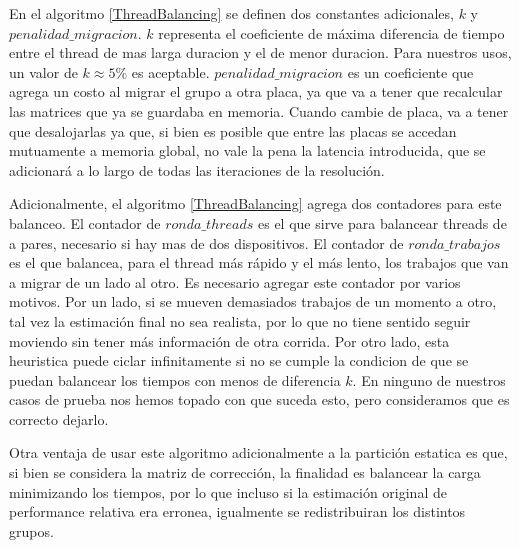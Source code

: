 En el algoritmo \ref{ThreadBalancing} se definen dos constantes adicionales, $k$ y $penalidad\_migracion$.
$k$ representa el coeficiente de m\'axima diferencia de tiempo entre el thread de mas larga duracion y el de menor
duracion. Para nuestros usos, un valor de $k \approx 5\%$ es aceptable.
$penalidad\_migracion$ es un coeficiente que agrega un costo al migrar el grupo a otra placa, ya que va
a tener que recalcular las matrices que ya se guardaba en memoria. Cuando cambie de placa, va a tener
que desalojarlas ya que, si bien es posible que entre las placas se accedan mutuamente a memoria global,
no vale la pena la latencia introducida, que se adicionar\'a a lo largo de todas las iteraciones de la resoluci\'on.

Adicionalmente, el algoritmo \ref{ThreadBalancing} agrega dos contadores para este balanceo. El contador de
$ronda\_threads$ es el que sirve para balancear threads de a pares, necesario si hay mas de dos dispositivos.
El contador de $ronda\_trabajos$ es el que balancea, para el thread m\'as r\'apido y el m\'as lento, los
trabajos que van a migrar de un lado al otro. Es necesario agregar este contador por varios motivos. Por
un lado, si se mueven demasiados trabajos de un momento a otro, tal vez la estimaci\'on final no sea realista, por
lo que no tiene sentido seguir moviendo sin tener m\'as informaci\'on de otra corrida. Por otro lado, esta
heuristica puede ciclar infinitamente si no se cumple la condicion de que se puedan balancear los tiempos
con menos de diferencia $k$. En ninguno de nuestros casos de prueba nos hemos topado con que suceda esto, pero
consideramos que es correcto dejarlo.

Otra ventaja de usar este algoritmo adicionalmente a la partici\'on estatica es que, si bien se considera la matriz
de correcci\'on, la finalidad es balancear la carga minimizando los tiempos, por lo que incluso si la estimaci\'on original
de performance relativa era erronea, igualmente se redistribuiran los distintos grupos.


